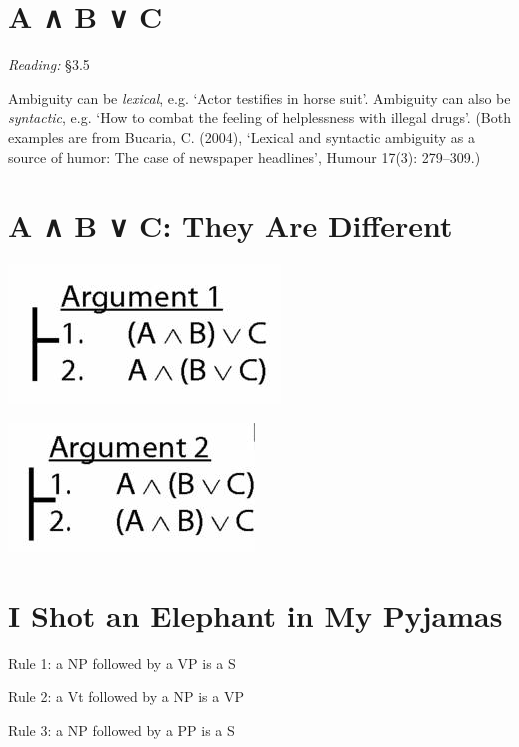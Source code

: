 \documentclass[12pt]{extarticle}
\begin{document}
\begin{multicols*}{3}
\vfill 
 
\section{A ∧ B ∨ C}
 
\emph{Reading:} §3.5
 
Ambiguity can be \emph{lexical}, e.g. `Actor testifies in horse suit'. Ambiguity can also be \emph{syntactic}, e.g. `How to combat the feeling of helplessness with illegal drugs'. (Both examples are from Bucaria, C. (2004), `Lexical and syntactic ambiguity as a source of humor: The case of newspaper headlines', Humour 17(3): 279--309.)
 
 
 
\section{A ∧ B ∨ C: They Are Different}
 
\begin{center}
\includegraphics[scale=0.3]{img/arg1_unit_153.png}
\end{center}
\begin{center}
\includegraphics[scale=0.3]{img/arg2_unit_153.png}
\end{center}
 
 
\section{I Shot an Elephant in My Pyjamas}
 
Rule 1: a NP followed by a VP is a S
 
Rule 2: a Vt followed by a NP is a VP
 
Rule 3: a NP followed by a PP is a S
 

\end{multicols*}
\end{document}

